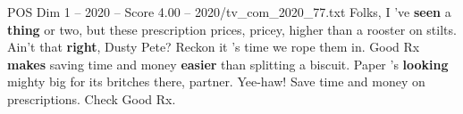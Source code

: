\begin{textsample}{POS Dim 1 – 2020 – Score 4.00 – 2020/tv\_com\_2020\_77.txt}  \label{ex:f1_pos_085}
Folks, I 've \textbf{seen} a \textbf{thing} or two, but these prescription prices, pricey, higher than a rooster on stilts.
Ain't that \textbf{right}, Dusty Pete?
Reckon it 's time we rope them in.
Good Rx \textbf{makes} saving time and money \textbf{easier} than splitting a biscuit.
Paper 's \textbf{looking} mighty big for its britches there, partner.
Yee-haw!
Save time and money on prescriptions.
Check Good Rx.

\end{textsample}
